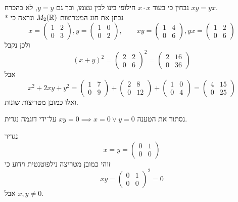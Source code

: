 נבחין כי בעוד $x \cdot x$ חילופי בינו לבין עצמו, וכך גם $y = y$, לא בהכרח $xy = yx$. \\*
נבחן את חוג המטריצות $M_2(\mathbb{R})$ ונראה כי
\[
	x = \begin{pmatrix}
		1 & 2 \\
		0 & 3
	\end{pmatrix},
	y = \begin{pmatrix}
		1 & 0 \\
		0 & 2
	\end{pmatrix},
	\qquad
	x y = \begin{pmatrix}
		1 & 4 \\
		0 & 6
	\end{pmatrix},
	y x = \begin{pmatrix}
		1 & 2 \\
		0 & 6
	\end{pmatrix}
\]
ולכן נקבל
\[
	{(x + y)}^2
	= \begin{pmatrix}
		2 & 2 \\
		0 & 6
	\end{pmatrix}^2
	= \begin{pmatrix}
		2 & 16 \\
		0 & 36
	\end{pmatrix}
\]
אבל
\[
	x^2 + 2 xy + y^2
	= \begin{pmatrix}
		1 & 7 \\
		0 & 9
	\end{pmatrix}
	+ \begin{pmatrix}
		2 & 8 \\
		0 & 12
	\end{pmatrix}
	+ \begin{pmatrix}
		1 & 0 \\
		0 & 4
	\end{pmatrix}
	= \begin{pmatrix}
		4 & 15 \\
		0 & 25
	\end{pmatrix}
\]
ואלו כמובן מטריצות שונות.

\Subquestion{}
נסתור את הטענה $xy = 0 \implies x = 0 \lor y = 0$ על־ידי דוגמה נגדית.

נגדיר
\[
	x = y = \begin{pmatrix}
		0 & 1 \\
		0 & 0
	\end{pmatrix}
\]
זוהי כמובן מטריצה נילפוטנטית וידוע כי
\[
	x y
	= \begin{pmatrix}
		0 & 1 \\
		0 & 0
	\end{pmatrix}^2
	= 0
\]
אבל $x, y \ne 0$.

